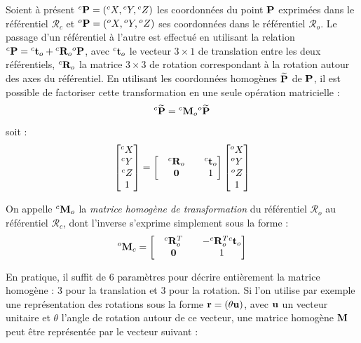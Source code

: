 Soient \`a pr\'esent ${}^c{\bf P} = ({}^cX, {}^cY, {}^cZ)$ les coordonnées du point ${\bf P}$ 
exprimées dans le référentiel $\mathcal R_c$ et ${}^o{\bf P} = ({}^oX, {}^oY, 
{}^oZ)$ ses coordonnées dans le référentiel $\mathcal R_o$. Le passage d'un 
référentiel à l'autre est effectué en utilisant la relation ${}^c{\bf P} = 
{}^c{\bf t}_o + {}^c{\bf R}_o {}^o{\bf P}$, avec ${}^c{\bf t}_o$ le vecteur 
$3\times 1$ de translation entre les deux référentiels, ${}^c{\bf R}_o$ la 
matrice $3\times 3$ de rotation correspondant à la rotation autour des axes du 
référentiel. En utilisant les coordonnées homogènes $\widetilde {\bf P}$ de 
${\bf P}$, il est possible de factoriser cette transformation en une seule 
opération matricielle :
\begin{equation}
{}^c \widetilde {\bf P} = {}^c {\bf M}_o {}^o \widetilde {\bf P}
\label{chap01:eq07}
\end{equation}
soit :
\begin{equation}
\begin{bmatrix}
{}^cX \\ {}^cY \\ {}^cZ \\ 1
\end{bmatrix}
=
\begin{bmatrix}
&  {}^c{\bf R}_o & & {}^c{\bf t}_o \\
& {\bf 0} & & 1
\end{bmatrix}
\begin{bmatrix}
{}^oX \\ {}^oY \\ {}^oZ \\ 1
\end{bmatrix}
\label{chap01:eq08}
\end{equation}

On appelle ${}^c{\bf M}_o$ la {\it matrice homogène de transformation} du 
référentiel $\mathcal R_o$ au référentiel $\mathcal R_c$, dont l'inverse 
s'exprime simplement sous la forme :
\begin{equation}
{}^o{\bf M}_c = 
\begin{bmatrix}
&  {}^c{\bf R}_o^T & & -{}^c{\bf R}_o^T {}^c{\bf t}_o \\
& {\bf 0} & & 1
\end{bmatrix}
\label{chap01:eq09}
\end{equation}

En pratique, il suffit de $6$ param\`etres pour d\'ecrire enti\`erement la matrice homog\`ene : $3$ pour la translation et $3$ pour la rotation. Si l'on utilise par exemple une repr\'esentation des rotations sous la forme ${\bf r} = (\theta {\bf u})$, avec $\bf u$ un vecteur unitaire et $\theta$ l'angle de rotation autour de ce vecteur, une matrice homog\`ene ${\bf M}$ peut \^etre repr\'esent\'ee par le vecteur suivant :

